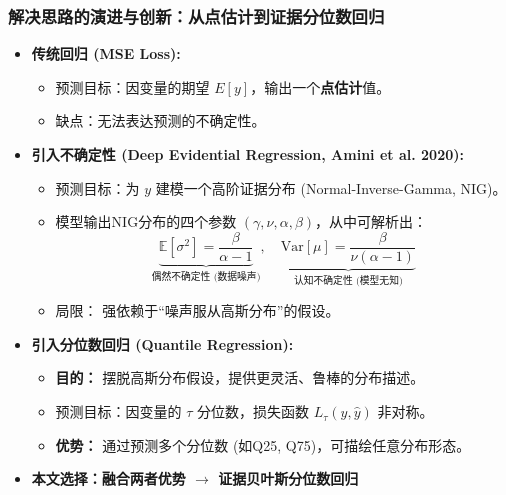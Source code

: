 \documentclass{beamer}
\begin{document}
\begin{frame}
    \frametitle{解决思路的演进与创新：从点估计到证据分位数回归}
    \begin{itemize}
        \item<1-> \textbf{传统回归 (MSE Loss):}
        \begin{itemize}
            \item 预测目标：因变量的期望 $E[y]$，输出一个\textbf{点估计}值。
            \item 缺点：无法表达预测的\alert{不确定性}。
        \end{itemize}
        \pause
        \item<2-> \textbf{引入不确定性 (Deep Evidential Regression, Amini et al. 2020):}
        \begin{itemize}
            \item 预测目标：为 $y$ 建模一个高阶证据分布 (Normal-Inverse-Gamma, NIG)。
            \item 模型输出NIG分布的四个参数 $(\gamma, \nu, \alpha, \beta)$，从中可解析出：
            $$ \underbrace{\mathbb{E}[\sigma^2] = \frac{\beta}{\alpha-1}}_{\text{偶然不确定性 (数据噪声)}} , \quad \underbrace{\mathrm{Var}[\mu] = \frac{\beta}{\nu(\alpha-1)}}_{\text{认知不确定性 (模型无知)}} $$
            \item \alert{局限：} 强依赖于“噪声服从高斯分布”的假设。
        \end{itemize}
        \pause
        \item<3-> \textbf{引入分位数回归 (Quantile Regression):}
        \begin{itemize}
            \item \textbf{目的：} 摆脱高斯分布假设，提供更灵活、鲁棒的分布描述。
            \item 预测目标：因变量的 $\tau$ 分位数，损失函数 $L_\tau(y, \hat{y})$ 非对称。
            \item \textbf{优势：} 通过预测多个分位数 (如Q25, Q75)，可描绘任意分布形态。
        \end{itemize}
        \pause
        \item<4-> \textbf{本文选择：融合两者优势 $\rightarrow$ \alert{证据贝叶斯分位数回归}}
    \end{itemize}
\end{frame}
\end{document}
